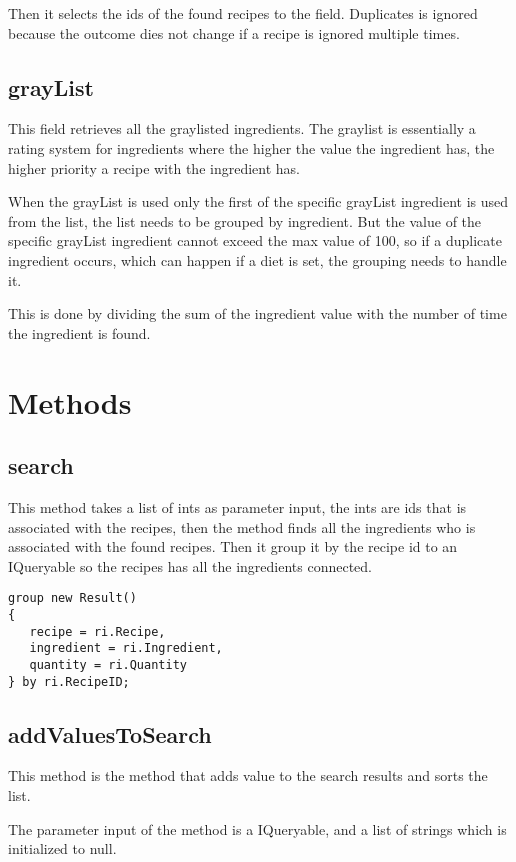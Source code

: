 Then it selects the ids of the found recipes to the field. Duplicates is ignored because the outcome dies not change if a recipe is ignored multiple times.

\subsection{grayList}
This field retrieves all the graylisted ingredients. The graylist is essentially a rating system for ingredients where the higher the value the ingredient has, the higher priority a recipe with the ingredient has.

When the grayList is used only the first of the specific grayList ingredient is used from the list, the list needs to be grouped by ingredient. But the value of the specific grayList ingredient cannot exceed the max value of 100, so if a duplicate ingredient occurs, which can happen if a diet is set, the grouping needs to handle it. 

This is done by dividing the sum of the ingredient value with the number of time the ingredient is found. 

\section{Methods}
\subsection{search}
This method takes a list of ints as parameter input, the ints are ids that is associated with the recipes, then the method finds all the ingredients who is associated with the found recipes. Then it group it by the recipe id to an IQueryable so the recipes has all the ingredients connected.

\begin{lstlisting}[caption=ResultGrouping, label={lst:ResultGrouping}, language=CSharp]
group new Result()
{
   recipe = ri.Recipe,
   ingredient = ri.Ingredient,
   quantity = ri.Quantity
} by ri.RecipeID;
\end{lstlisting}

\subsection{addValuesToSearch}
This method is the method that adds value to the search results and sorts the list.

The parameter input of the method is a IQueryable, and a list of strings which is initialized to null.

